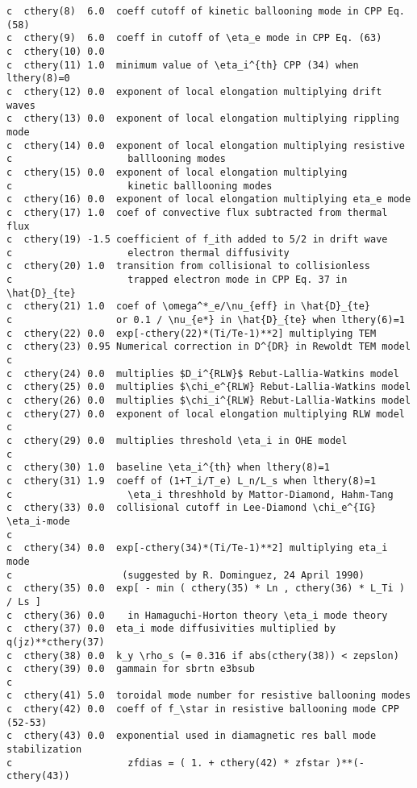 \begin{verbatim}
c  cthery(8)  6.0  coeff cutoff of kinetic ballooning mode in CPP Eq. (58)
c  cthery(9)  6.0  coeff in cutoff of \eta_e mode in CPP Eq. (63)
c  cthery(10) 0.0  
c  cthery(11) 1.0  minimum value of \eta_i^{th} CPP (34) when lthery(8)=0
c  cthery(12) 0.0  exponent of local elongation multiplying drift waves
c  cthery(13) 0.0  exponent of local elongation multiplying rippling mode
c  cthery(14) 0.0  exponent of local elongation multiplying resistive
c                    balllooning modes
c  cthery(15) 0.0  exponent of local elongation multiplying
c                    kinetic balllooning modes
c  cthery(16) 0.0  exponent of local elongation multiplying eta_e mode
c  cthery(17) 1.0  coef of convective flux subtracted from thermal flux
c  cthery(19) -1.5 coefficient of f_ith added to 5/2 in drift wave
c                    electron thermal diffusivity
c  cthery(20) 1.0  transition from collisional to collisionless
c                    trapped electron mode in CPP Eq. 37 in \hat{D}_{te}
c  cthery(21) 1.0  coef of \omega^*_e/\nu_{eff} in \hat{D}_{te}
c                  or 0.1 / \nu_{e*} in \hat{D}_{te} when lthery(6)=1
c  cthery(22) 0.0  exp[-cthery(22)*(Ti/Te-1)**2] multiplying TEM
c  cthery(23) 0.95 Numerical correction in D^{DR} in Rewoldt TEM model
c
c  cthery(24) 0.0  multiplies $D_i^{RLW}$ Rebut-Lallia-Watkins model
c  cthery(25) 0.0  multiplies $\chi_e^{RLW} Rebut-Lallia-Watkins model
c  cthery(26) 0.0  multiplies $\chi_i^{RLW} Rebut-Lallia-Watkins model
c  cthery(27) 0.0  exponent of local elongation multiplying RLW model
c
c  cthery(29) 0.0  multiplies threshold \eta_i in OHE model
c
c  cthery(30) 1.0  baseline \eta_i^{th} when lthery(8)=1
c  cthery(31) 1.9  coeff of (1+T_i/T_e) L_n/L_s when lthery(8)=1
c                    \eta_i threshhold by Mattor-Diamond, Hahm-Tang
c  cthery(33) 0.0  collisional cutoff in Lee-Diamond \chi_e^{IG} \eta_i-mode
c
c  cthery(34) 0.0  exp[-cthery(34)*(Ti/Te-1)**2] multiplying eta_i mode
c                   (suggested by R. Dominguez, 24 April 1990)
c  cthery(35) 0.0  exp[ - min ( cthery(35) * Ln , cthery(36) * L_Ti ) / Ls ]
c  cthery(36) 0.0    in Hamaguchi-Horton theory \eta_i mode theory
c  cthery(37) 0.0  eta_i mode diffusivities multiplied by q(jz)**cthery(37)
c  cthery(38) 0.0  k_y \rho_s (= 0.316 if abs(cthery(38)) < zepslon)
c  cthery(39) 0.0  gammain for sbrtn e3bsub
c
c  cthery(41) 5.0  toroidal mode number for resistive ballooning modes
c  cthery(42) 0.0  coeff of f_\star in resistive ballooning mode CPP (52-53)
c  cthery(43) 0.0  exponential used in diamagnetic res ball mode stabilization
c                    zfdias = ( 1. + cthery(42) * zfstar )**(-cthery(43))

\end{verbatim}
